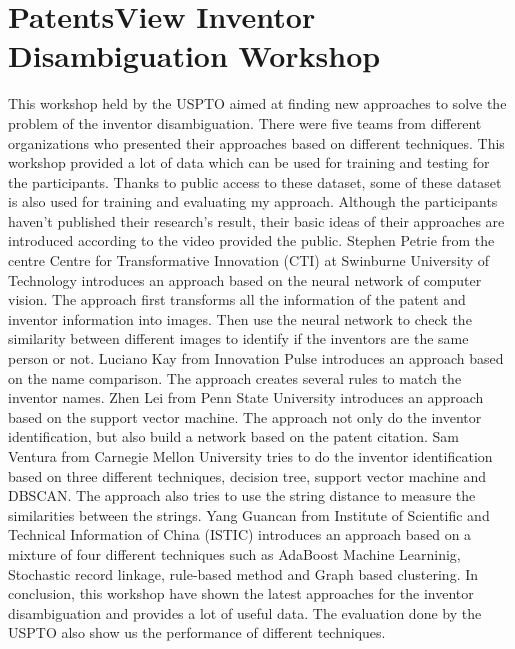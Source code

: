 \section{PatentsView Inventor Disambiguation Workshop}
This workshop held by the USPTO aimed at finding new approaches to solve the problem of the inventor disambiguation. There were five teams from different organizations who presented their approaches based on different techniques. This workshop provided a lot of data which can be used for training and testing for the participants. Thanks to public access to these dataset, some of these dataset is also used for training and evaluating my approach. Although the participants haven't published their research's result, their basic ideas of their approaches are introduced according to the video provided the public. Stephen Petrie from the centre Centre for Transformative Innovation (CTI) at Swinburne University of Technology introduces an approach based on the neural network of computer vision. The approach first transforms all the information of the patent and inventor information into images. Then use the neural network to check the similarity between different images to identify if the inventors are the same person or not.  Luciano Kay from Innovation Pulse introduces an approach based on the name comparison. The approach creates several rules to match the inventor names. Zhen Lei from Penn State University introduces an approach based on the support vector machine. The approach not only do the inventor identification, but also build a network based on the patent citation. Sam Ventura from Carnegie Mellon University tries to do the inventor identification based on three different techniques, decision tree, support vector machine and DBSCAN. The approach also tries to use the string distance to measure the similarities between the strings. Yang Guancan from Institute of Scientific and Technical Information of China (ISTIC) introduces an approach based on a mixture of four different techniques such as AdaBoost Machine Learninig, Stochastic record linkage, rule-based method and Graph based clustering. In conclusion, this workshop have shown the latest approaches for the inventor disambiguation and provides a lot of useful data. The evaluation done by the USPTO also show us the performance of different techniques.
